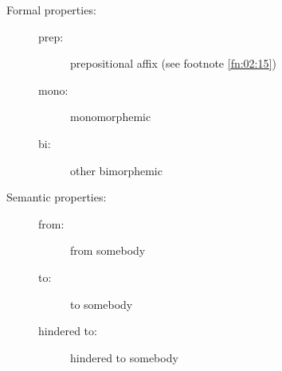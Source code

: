 \documentclass[output=paper]{langscibook}
\begin{document}
\label{falk:appendix:2}
\begin{description}
     \item[Formal properties:] 
       \begin{description}
          \item[]
          \item[prep:] prepositional affix (see footnote \ref{fn:02:15})
          \item[mono:] monomorphemic
          \item[bi:] other bimorphemic 
       \end{description}
     \item[Semantic properties:]
     \begin{description}
          \item[]
          \item[from:]  from somebody
          \item[to:]  to somebody
          \item[hindered to:] hindered  to somebody
      \end{description}
\end{description}
\end{document}
